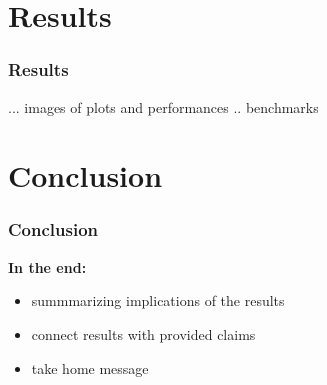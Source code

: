\documentclass[16pt]{beamer}
\begin{document}
\section{ Results }
\begin{frame}
  \frametitle{Results}
  ...
  images of plots and performances .. benchmarks
\end{frame}

\section{ Conclusion}
\begin{frame}
  \frametitle{Conclusion}
  \textbf{ In the end: } \\
  \begin{itemize}
  \item summmarizing implications of the results
  \item connect results with provided claims
  \item take home message
  \end{itemize}
\end{frame}
\end{document}
